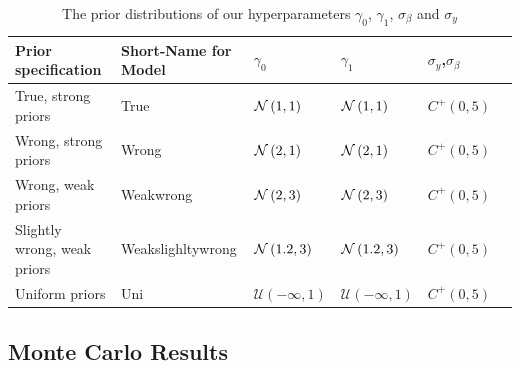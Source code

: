 \begin{table}[!ht]
\begin{center}
\begin{tabular}{l l l l l l}
Prior specification & Short-Name for Model & $\gamma_0$ & $\gamma_1$ & $\sigma_y$,$\sigma_\beta$\\
\hline
True, strong priors &  True & $\mathcal{N}\left(1,1\right)$ & $\mathcal{N}\left(1,1\right) $ & $C^+(0, 5)$\\
Wrong, strong priors & Wrong  &$\mathcal{N}\left(2,1\right)$ & $\mathcal{N}\left(2,1\right)$ & $C^+(0, 5)$\\
Wrong, weak priors &  Weakwrong  & $\mathcal{N}\left(2,3\right)$ &$ \mathcal{N}\left(2,3\right)$ & $C^+(0, 5)$\\
Slightly wrong, weak priors &  Weakslighltywrong & $ \mathcal{N}\left(1.2,3\right)$ &$\mathcal{N}\left(1.2,3\right)$ & $C^+(0, 5)$\\
Uniform priors & Uni &$\mathcal{U(-\infty,1)}$ & $\mathcal{U(-\infty,1)}$ & $C^+(0, 5)$\\
\end{tabular}
\end{center}
\caption{The prior distributions of our hyperparameters $\gamma_0$, $\gamma_1$, $\sigma_\beta$ and  $\sigma_y$}
\label{tab:prior_table}
\end{table}


\subsection{Monte Carlo Results}

